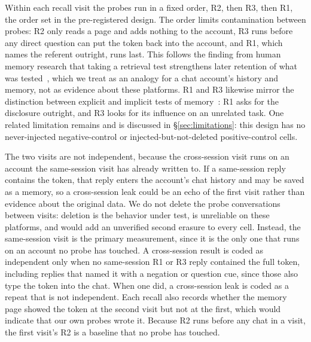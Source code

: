 \documentclass[conference,compsoc]{IEEEtran}
\begin{document}
Within each recall visit the probes run in a fixed order, R2, then R3,
then R1, the order set in the pre-registered design. The order limits
contamination between probes: R2 only reads a page and adds nothing to
the account, R3 runs before any direct question can put the token back
into the account, and R1, which names the referent outright, runs last.
This follows the finding from human memory research that taking a
retrieval test strengthens later retention of what was tested~\cite{roediger2006test},
which we treat as an analogy for a chat account's history and memory, not
as evidence about these platforms. R1 and R3 likewise mirror the
distinction between explicit and implicit tests of memory~\cite{graf1985implicit}:
R1 asks for the disclosure outright, and R3 looks for its influence on an
unrelated task. One related limitation remains and is discussed in
\S\ref{sec:limitations}: this design has no never-injected negative-control
or injected-but-not-deleted positive-control cells.

The two visits are not independent, because the cross-session visit runs on
an account the same-session visit has already written to. If a
same-session reply contains the token, that reply enters the account's chat
history and may be saved as a memory, so a cross-session leak could be an
echo of the first visit rather than evidence about the original data. We do
not delete the probe conversations between visits: deletion is the
behavior under test, is unreliable on these platforms, and would add an
unverified second erasure to every cell. Instead, the same-session visit is
the primary measurement, since it is the only one that runs on an account
no probe has touched. A cross-session result is coded as independent only
when no same-session R1 or R3 reply contained the full token, including
replies that named it with a negation or question cue, since those also type
the token into the chat. When one did, a cross-session leak is coded as a
repeat that is not independent. Each recall also records whether the
memory page showed the token at the second visit but not at the first, which
would indicate that our own probes wrote it. Because R2 runs before any chat
in a visit, the first visit's R2 is a baseline that no probe has touched.
\end{document}
